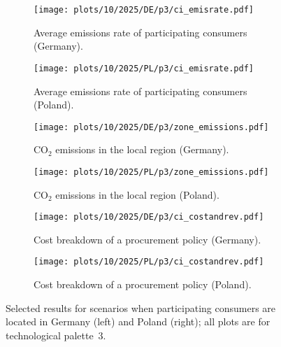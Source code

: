 \begin{figure*}
    \centering
    \begin{subfigure}{0.5\textwidth}
        \centering
        \caption{Average emissions rate of participating consumers (Germany).}
        \texttt{[image: plots/10/2025/DE/p3/ci\_emisrate.pdf]}
        \label{fig:10-2025-DE-p3-ci_emisrate}
    \end{subfigure}%
    \begin{subfigure}{0.5\textwidth}
        \centering
        \caption{Average emissions rate of participating consumers (Poland).}
        \texttt{[image: plots/10/2025/PL/p3/ci\_emisrate.pdf]}
        \label{fig:10-2025-PL-p3-ci_emisrate}
    \end{subfigure}

    \begin{subfigure}{0.5\textwidth}
        \centering
        \caption{CO$_2$ emissions in the local region (Germany).}
        \texttt{[image: plots/10/2025/DE/p3/zone\_emissions.pdf]}
        \label{fig:10-2025-DE-p3-zone_emissions}
    \end{subfigure}%
    \begin{subfigure}{0.5\textwidth}
        \centering
        \caption{CO$_2$ emissions in the local region (Poland).}
        \texttt{[image: plots/10/2025/PL/p3/zone\_emissions.pdf]}
        \label{fig:10-2025-PL-p3-zone_emissions}
    \end{subfigure}%

    \begin{subfigure}{0.5\textwidth}
        \centering
        \caption{Cost breakdown of a procurement policy (Germany).}
        \texttt{[image: plots/10/2025/DE/p3/ci\_costandrev.pdf]}
        \label{fig:10-2025-DE-p3-ci_costandrev}
    \end{subfigure}%
    \begin{subfigure}{0.5\textwidth}
        \centering
        \caption{Cost breakdown of a procurement policy (Poland).}
        \texttt{[image: plots/10/2025/PL/p3/ci\_costandrev.pdf]}
        \label{fig:10-2025-PL-p3-ci_costandrev}
    \end{subfigure}
    \caption{Selected results for scenarios when participating consumers are located in Germany (left) and Poland (right); all plots are for technological palette~3.} 
    \label{fig:10-2025-DEPL-p3-4plots}
\end{figure*}



